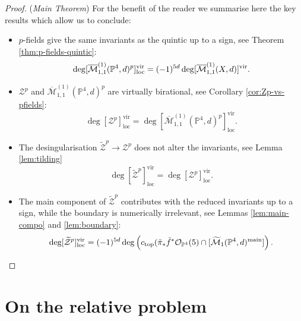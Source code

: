 \documentclass[11pt]{amsart}
\newcommand{\pazocal}{\mathcal}
\newcommand{\Mone}[3]{\overline{\pazocal M}^{(1)}_{1,#1}(#2,#3)}
\newcommand{\Zp}{\pazocal Z^p}
\newcommand{\tZp}{\widetilde{\pazocal Z}^p}
\newcommand{\PP}{\mathbb P}
\newcommand{\OO}{\mathcal{O}}
\renewcommand{\to}{\rightarrow}
\newcommand{\virloc}[1]{[#1]^{\mathrm{vir}}_{\mathrm{loc}}}
\theoremstyle{definition}
\theoremstyle{definition}
\begin{document}
\begin{proof}(\emph{Main Theorem})
For the benefit of the reader we summarise here the key results which allow us to conclude:
\begin{itemize}
\item $p$-fields give the same invariants as the quintic up to a sign, see Theorem \ref{thm:p-fields-quintic}: \[\deg[\Mone{1}{\PP^4}{d}^p]^{\rm{vir}}_{\rm{loc}}= (-1)^{5d}\deg[\Mone{1}{X}{d}]^{\rm{vir}}.\]
\item $\Zp$ and $\Mone{1}{\PP^4}{d}^p$ are virtually birational, see Corollary \ref{cor:Zp-vs-pfields}:
\[\deg\virloc{\Zp}=\deg\virloc{\Mone{1}{\PP^4}{d}^p}.\]
\item The desingularisation $\tZp\to \Zp$ does not alter the invariants, see Lemma \ref{lem:tilding} \[\deg\virloc{\tZp}=\deg\virloc{\Zp}.\]
\item The main component of $\tZp$ contributes with the reduced invariants up to a sign, while the boundary is numerically irrelevant, see Lemmas \ref{lem:main-compo} and \ref{lem:boundary}:
\[\deg\virloc{\tZp}=(-1)^{5d}\deg\left(c_{\rm{top}}(\tilde\pi_*\tilde f^*\OO_{\PP^4}(5)\cap[\widetilde{\pazocal M}_1(\PP^4,d)^{\rm{main}}]\right).\]
\end{itemize}


\end{proof}
\section{On the relative problem}




\end{document}
